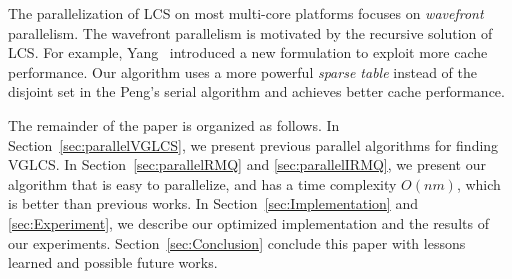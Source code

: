 The parallelization of LCS on most multi-core platforms focuses on
{\em wavefront} parallelism.  The wavefront parallelism is motivated
by the recursive solution of LCS.  For example,
Yang~\cite{Yang2010AnEP} introduced a new formulation to exploit more
cache performance.  Our algorithm uses a more powerful {\em sparse
  table} instead of the disjoint set in the Peng's serial algorithm
and achieves better cache performance.

The remainder of the paper is organized as follows.  In
Section~\ref{sec:parallelVGLCS}, we present previous parallel
algorithms for finding VGLCS.  In Section~\ref{sec:parallelRMQ} and
\ref{sec:parallelIRMQ}, we present our algorithm that is easy to
parallelize, and has a time complexity $O(nm)$, which is better than
previous works.  In Section~\ref{sec:Implementation} and
\ref{sec:Experiment}, we describe our optimized implementation and the
results of our experiments.  Section~\ref{sec:Conclusion} conclude
this paper with lessons learned and possible future works.

